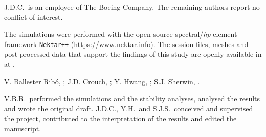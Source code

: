 \documentclass[lineno]{jfm}
\begin{document}
\begin{bmhead}
J.D.C.\ is an employee of The Boeing Company. The remaining authors report no conflict of interest.
\end{bmhead}

\begin{bmhead}
The simulations were performed with the open-source spectral/\textit{hp} element framework \texttt{Nektar++} (\url{https://www.nektar.info}). The session files, meshes and post-processed data that support the findings of this study are openly available in  at .
\end{bmhead}

\begin{bmhead}
V. Ballester Ribó, ; J.D. Crouch, ; Y. Hwang, ; S.J. Sherwin, .
\end{bmhead}

\begin{bmhead}
 V.B.R.\ performed the simulations and the stability analyses, analysed the results and wrote the original draft. J.D.C., Y.H.\ and S.J.S.\ conceived and supervised the project, contributed to the interpretation of the results and edited the manuscript.
\end{bmhead}



\end{document}
